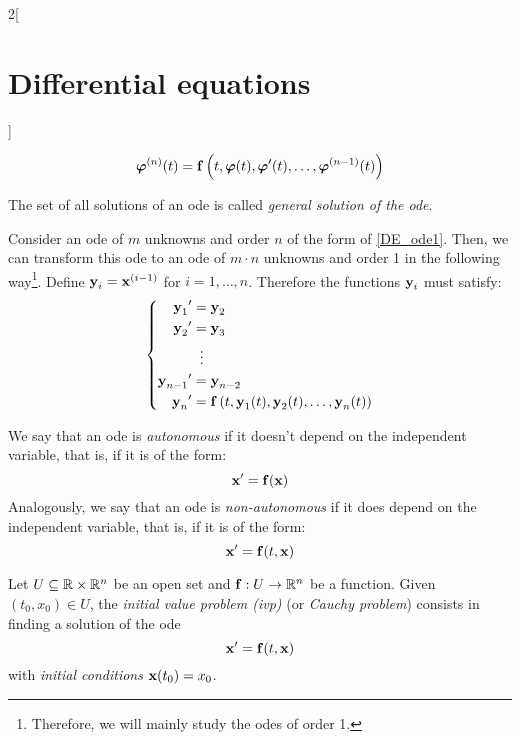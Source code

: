 \documentclass[../../../main.tex]{subfiles}
\begin{document}
\begin{multicols}{2}[\section{Differential equations}]
\begin{definition}
\begin{itemize}
            $$\boldsymbol{\mathrm{\varphi}}^{(n)}(t)=\boldsymbol{\mathrm{f}}\left(t,\boldsymbol{\mathrm{\varphi}}(t),\boldsymbol{\mathrm{\varphi}}'(t),\ldots,\boldsymbol{\mathrm{\varphi}}^{(n-1)}(t)\right)$$
    \end{itemize}
    The set of all solutions of an ode is called \textit{general solution of the ode}.
  \end{definition}
  \begin{prop}
    Consider an ode of $m$ unknowns and order $n$ of the form of \eqref{DE_ode1}. Then, we can transform this ode to an ode of $m\cdot n$ unknowns and order 1 in the following way\footnote{Therefore, we will mainly study the odes of order 1.}. Define $\boldsymbol{\mathrm{y}}_i=\boldsymbol{\mathrm{x}}^{(i-1)}$ for $i=1,\ldots,n$. Therefore the functions $\boldsymbol{\mathrm{y}}_i$ must satisfy:
    \begin{equation*}
      \left\{
      \begin{aligned}
        {\boldsymbol{\mathrm{y}}_1}'     & =\boldsymbol{\mathrm{y}}_2                                                                                            \\
        {\boldsymbol{\mathrm{y}}_2}'     & =\boldsymbol{\mathrm{y}}_3                                                                                            \\
                                    & \;\;\vdots                                                                                                       \\
        {\boldsymbol{\mathrm{y}}_{n-1}}' & =\boldsymbol{\mathrm{y}}_{n-2}                                                                                        \\
        {\boldsymbol{\mathrm{y}}_n}'     & =\boldsymbol{\mathrm{f}}\left(t,\boldsymbol{\mathrm{y}}_1(t),\boldsymbol{\mathrm{y}}_2(t),\ldots,\boldsymbol{\mathrm{y}}_n(t)\right) \\
      \end{aligned}
      \right.
    \end{equation*}
  \end{prop}
  \begin{definition}
    We say that an ode is \textit{autonomous} if it doesn't depend on the independent variable, that is, if it is of the form: $$\boldsymbol{\mathrm{x}}'=\boldsymbol{\mathrm{f}}(\boldsymbol{\mathrm{x}})$$ Analogously, we say that an ode is \textit{non-autonomous} if it does depend on the independent variable, that is, if it is of the form: $$\boldsymbol{\mathrm{x}}'=\boldsymbol{\mathrm{f}}(t,\boldsymbol{\mathrm{x}})$$
  \end{definition}
  \begin{definition}
    Let $U\subseteq\mathbb{R}\times\mathbb{R}^n$ be an open set and $\boldsymbol{\mathrm{f}}:U\rightarrow\mathbb{R}^n$ be a function. Given $(t_0,x_0)\in U$, the \textit{initial value problem (ivp)} (or \textit{Cauchy problem}) consists in finding a solution of the ode $$\boldsymbol{\mathrm{x}}'=\boldsymbol{\mathrm{f}}(t,\boldsymbol{\mathrm{x}})$$ with \textit{initial conditions} $\boldsymbol{\mathrm{x}}(t_0)=x_0$.
  \end{definition}

\end{multicols}
\end{document}
